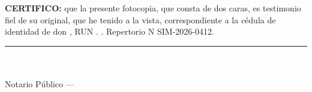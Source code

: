 \documentclass[11pt]{article}
\begin{document}
\vspace{4pt}
{\SIMserif\small
\textbf{CERTIFICO:} que la presente fotocopia, que consta de dos caras, es testimonio fiel de su original, que he tenido a la vista, correspondiente a la cédula de identidad de don \LFXrepresentante, RUN \SIMrunrepresentante. \SIMfecha. Repertorio N\textdegree{} SIM-2026-0412.\par}

\vspace{0pt}
\noindent\begin{minipage}[b]{0.4\linewidth}\SIMtimbrenotarial[2cm]\end{minipage}\hfill
\begin{minipage}[b]{0.5\linewidth}\centering\rule{6cm}{0.5pt}\\\SIMnotarioTitular\\Notario Público --- \SIMnotaria\\{\small\SIMnotariaDir}\end{minipage}

\end{document}
